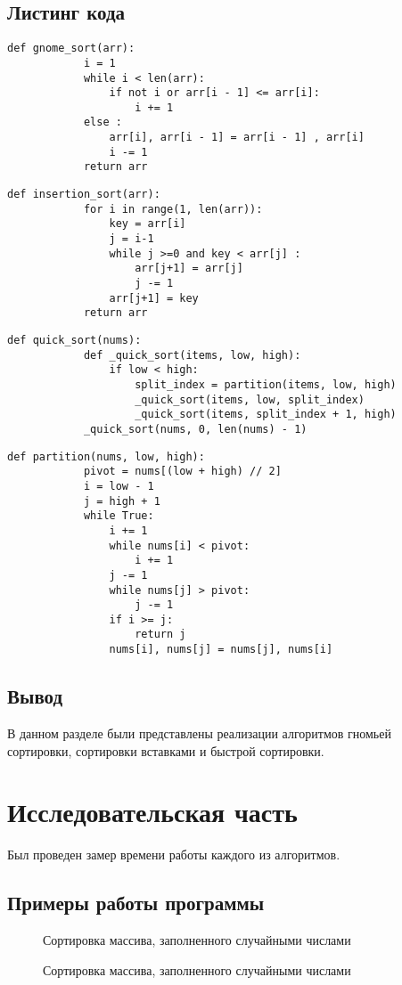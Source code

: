 \documentclass[12pt]{report}
\begin{document}
	\section{Листинг кода}
	\begin{lstlisting}[label=gnome,caption=Алгоритм гномьей сортировки]
		def gnome_sort(arr):
			i = 1
			while i < len(arr):
				if not i or arr[i - 1] <= arr[i]:
					i += 1
			else :
				arr[i], arr[i - 1] = arr[i - 1] , arr[i]
				i -= 1
			return arr
	\end{lstlisting}
	\newpage
	\begin{lstlisting}[label=insertion,caption=Алгоритм сортировки вставками]
		def insertion_sort(arr):
			for i in range(1, len(arr)):
				key = arr[i]
				j = i-1
				while j >=0 and key < arr[j] :
					arr[j+1] = arr[j]
					j -= 1
				arr[j+1] = key
			return arr
	\end{lstlisting}
	
	\begin{lstlisting}[label=quick,caption=Алгоритм быстрой сортировки]
		def quick_sort(nums):  
			def _quick_sort(items, low, high):
				if low < high:
					split_index = partition(items, low, high)
					_quick_sort(items, low, split_index)
					_quick_sort(items, split_index + 1, high)
			_quick_sort(nums, 0, len(nums) - 1)
	\end{lstlisting}
	
	\begin{lstlisting}[label=pivot,caption=Алгоритм поиска опорного элемента]
		def partition(nums, low, high):
			pivot = nums[(low + high) // 2]
			i = low - 1
			j = high + 1
			while True:
				i += 1
				while nums[i] < pivot:
					i += 1
				j -= 1
				while nums[j] > pivot:
					j -= 1
				if i >= j:
					return j
				nums[i], nums[j] = nums[j], nums[i]
	\end{lstlisting}
	
	
	\section{Вывод}
	В данном разделе были представлены реализации алгоритмов гномьей сортировки, сортировки вставками и быстрой сортировки.
	
	\chapter{Исследовательская часть}
	Был проведен замер времени работы каждого из алгоритмов.
	
	\section{Примеры работы программы}
	\begin{figure}[h]
		\caption{Сортировка массива, заполненного случайными числами}
		\label{ris:image}
	\end{figure}
	\newpage
	\begin{figure}[h]
		\caption{Сортировка массива, заполненного случайными числами}
		\label{ris:image}
	\end{figure}
	
\end{document}
